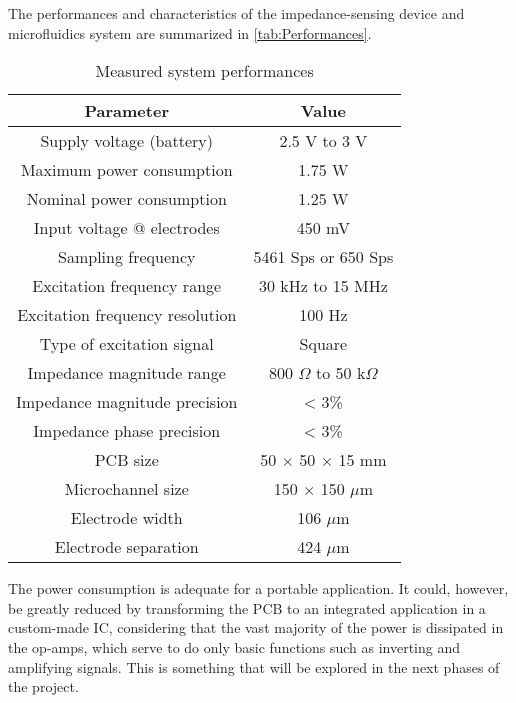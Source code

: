 The performances and characteristics of the impedance-sensing device and microfluidics system are summarized in \autoref{tab:Performances}.

\begin{table}[h]
\centering
\caption{\label{tab:Performances} Measured system performances}
\begin{tabular}{|c | c|} 
 \hline
 Parameter & Value \\ [0.5ex] 
 \hline
 Supply voltage (battery) & 2.5 V to 3 V  \\ 
 \hline
 Maximum power consumption & 1.75 W \\
 \hline
 Nominal power consumption & 1.25 W \\
 \hline
 Input voltage @ electrodes & 450 mV \\
 \hline
 Sampling frequency & 5461 Sps or 650 Sps \\ 
 \hline
 Excitation frequency range & 30 kHz to 15 MHz \\
 \hline
 Excitation frequency resolution & 100 Hz \\
 \hline
 Type of excitation signal & Square \\ 
 \hline
 Impedance magnitude range & 800 $\Omega$ to 50 k$\Omega$ \\
 \hline
 Impedance magnitude precision & < 3\% \\
 \hline
 Impedance phase precision & < 3\% \\
 \hline
 PCB size & 50 $\times$ 50 $\times$ 15 mm \\ [1ex] 
 \hline
 Microchannel size & 150 $\times$ 150 $\mu$m \\
 \hline
 Electrode width & 106 $\mu$m \\
 \hline
 Electrode separation & 424 $\mu$m \\
 \hline
\end{tabular}
\end{table}

The power consumption is adequate for a portable application. It could, however, be greatly reduced by transforming the PCB to an integrated application in a custom-made IC, considering that the vast majority of the power is dissipated in the op-amps, which serve to do only basic functions such as inverting and amplifying signals. This is something that will be explored in the next phases of the project. 